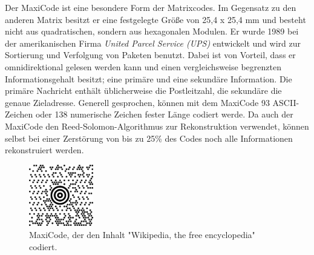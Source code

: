 Der MaxiCode ist eine besondere Form der Matrixcodes. Im Gegensatz zu den anderen Matrix besitzt er eine festgelegte Größe von 25,4 x 25,4 mm und besteht nicht aus quadratischen, sondern aus hexagonalen Modulen. Er wurde 1989 bei der amerikanischen Firma \textit{United Parcel Service (UPS)} entwickelt und wird zur Sortierung und Verfolgung von Paketen benutzt. Dabei ist von Vorteil, dass er omnidirektional gelesen werden kann und einen vergleichsweise begrenzten Informationsgehalt besitzt; eine primäre und eine sekundäre Information. Die primäre Nachricht enthält üblicherweise die Postleitzahl, die sekundäre die genaue Zieladresse. Generell gesprochen, können mit dem MaxiCode 93 ASCII-Zeichen oder 138 numerische Zeichen fester Länge codiert werde.
Da auch der MaxiCode den Reed-Solomon-Algorithmus zur Rekonstruktion verwendet, können selbst bei einer Zerstörung von bis zu 25\% des Codes noch alle Informationen rekonstruiert werden. \cite{DatalogicScanning2007} \cite{Lipinski2016}
\begin{figure}
	\centering
	\includegraphics[width=0.25\textwidth]{Bilder/MaxiCode.png} 
	\caption[MaxiCode]{MaxiCode, der den Inhalt "Wikipedia, the free encyclopedia" codiert.\footnotemark}
	\label{fig:maxicode}	
\end{figure}
\pagebreak

